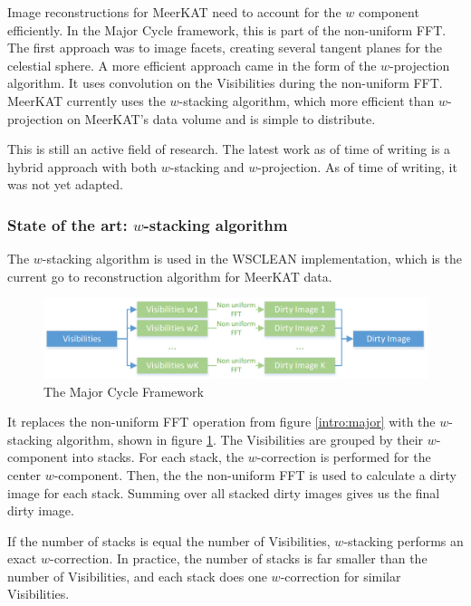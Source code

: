 Image reconstructions for MeerKAT need to account for the $w$ component efficiently. In the Major Cycle framework, this is part of the non-uniform FFT. The first approach was to image facets, creating several tangent planes for the celestial sphere. A more efficient approach came in the form of the $w$-projection algorithm\cite{cornwell2008noncoplanar}. It uses convolution on the Visibilities during the non-uniform FFT. MeerKAT currently uses the $w$-stacking algorithm, which more efficient than $w$-projection on MeerKAT's data volume and is simple to distribute.


This is still an active field of research. The latest work as of time of writing is a hybrid approach\cite{pratley2018fast} with both $w$-stacking and $w$-projection. As of time of writing, it was not yet adapted.


\subsubsection{State of the art: $w$-stacking algorithm}
The $w$-stacking algorithm is used in the WSCLEAN implementation, which is the current go to reconstruction algorithm for MeerKAT data.

\begin{figure}
	\centering
	\vspace{-10pt}
	\includegraphics[width=1.0\linewidth]{./chapters/03.challenges/w-stacks.png}
	\caption{The Major Cycle Framework}
	\label{meerkat:w-stacks}
	\vspace{-10pt}
\end{figure}

It replaces the non-uniform FFT operation from figure \ref{intro:major} with the $w$-stacking algorithm, shown in figure \ref{meerkat:w-stacks}. The Visibilities are grouped by their $w$-component into stacks. For each stack, the $w$-correction is performed for the center $w$-component. Then, the the non-uniform FFT is used to calculate a dirty image for each stack. Summing over all stacked dirty images gives us the final dirty image.

If the number of stacks is equal the number of Visibilities, $w$-stacking performs an exact $w$-correction. In practice, the number of stacks is far smaller than the number of Visibilities, and each stack does one $w$-correction for similar Visibilities. 


